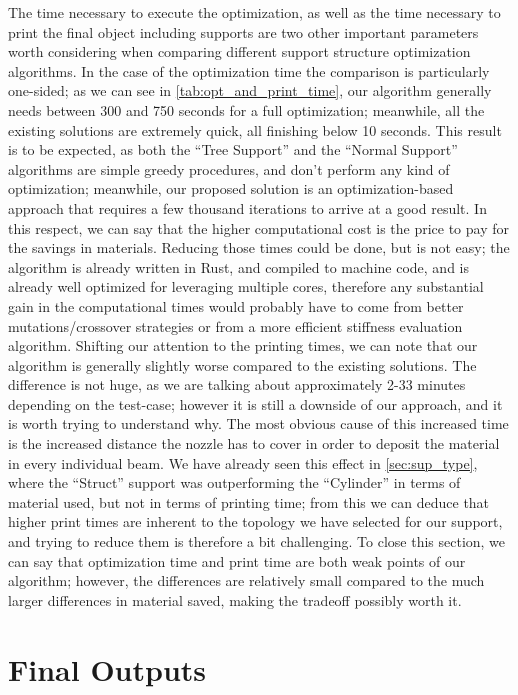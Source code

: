 The time necessary to execute the optimization,
as well as the time necessary to print the final object including supports are two other
important parameters worth considering when comparing different support structure optimization
algorithms.
In the case of the optimization time the comparison is particularly one-sided; as we can see
in \cref{tab:opt_and_print_time}, our algorithm generally needs between 300 and 750 seconds
for a full optimization; meanwhile, all the existing solutions are extremely quick, all finishing
below 10 seconds. This result is to be expected, as both the ``Tree Support'' and the ``Normal Support''
algorithms are simple greedy procedures, and don't perform any kind of optimization;
meanwhile, our proposed solution is an optimization-based approach that requires a few
thousand iterations to arrive at a good result. In this respect, we can say that the higher
computational cost is the price to pay for the savings in materials.
Reducing those times could be done, but is not easy; the algorithm is already written in Rust,
and compiled to machine code, and is already well optimized for leveraging multiple cores,
therefore any substantial gain in the computational times would probably have to come from 
better mutations/crossover strategies or from a more efficient stiffness evaluation algorithm.
Shifting our attention to the printing times, we can note that our algorithm is generally slightly
worse compared to the existing solutions. The difference is not huge, as we are talking about 
approximately 2-33 minutes depending on the test-case; however it is still a downside of our approach,
and it is worth trying to understand why.
The most obvious cause of this increased time is the increased distance the nozzle has to cover
in order to deposit the material in every individual beam.
We have already seen this effect in \cref{sec:sup_type}, where the ``Struct''
support was outperforming the ``Cylinder'' in terms of material used, but not in terms of printing
time; from this we can deduce that higher print times are inherent to the topology we have selected
for our support, and trying to reduce them is therefore a bit challenging.
To close this section, we can say that optimization time and print time are both
weak points of our algorithm; however, the differences are relatively small
compared to the much larger differences in material saved, making the tradeoff
possibly worth it.

\section{Final Outputs}

